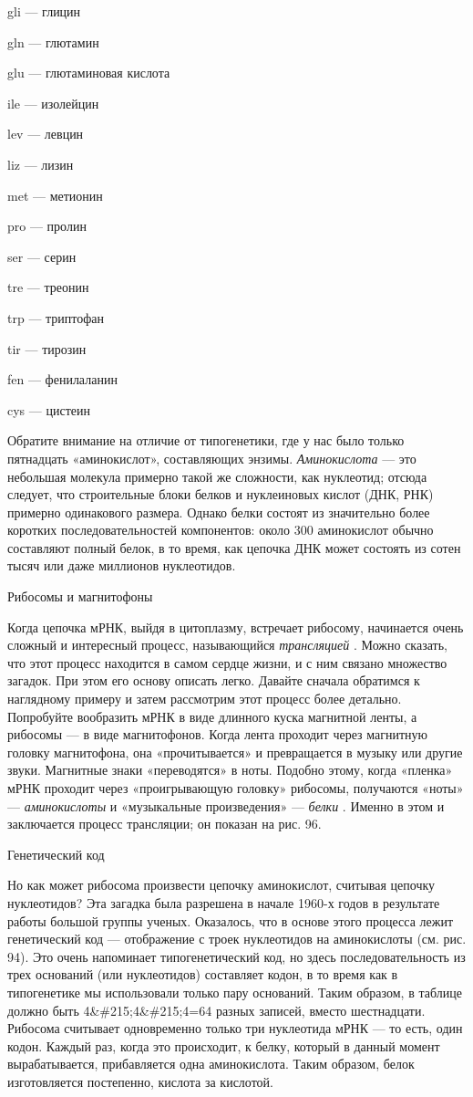 \documentclass[../main.tex]{subfiles}
\begin{document}
gli --- глицин

gln --- глютамин

glu --- глютаминовая кислота

ile --- изолейцин

lev --- левцин

liz --- лизин

met --- метионин

pro --- пролин

ser --- серин

tre --- треонин

trp --- триптофан

tir --- тирозин

fen --- фенилаланин

cys --- цистеин

Обратите внимание на отличие от типогенетики, где у нас было только пятнадцать «аминокислот», составляющих энзимы. \emph{Аминокислота} --- это небольшая молекула примерно такой же сложности, как нуклеотид; отсюда следует, что строительные блоки белков и нуклеиновых кислот (ДНК, РНК) примерно одинакового размера. Однако белки состоят из значительно более коротких последовательностей компонентов: около 300 аминокислот обычно составляют полный белок, в то время, как цепочка ДНК может состоять из сотен тысяч или даже миллионов нуклеотидов.

Рибосомы и магнитофоны

Когда цепочка мРНК, выйдя в цитоплазму, встречает рибосому, начинается очень сложный и интересный процесс, называющийся \emph{трансляцией} . Можно сказать, что этот процесс находится в самом сердце жизни, и с ним связано множество загадок. При этом его основу описать легко. Давайте сначала обратимся к наглядному примеру и затем рассмотрим этот процесс более детально. Попробуйте вообразить мРНК в виде длинного куска магнитной ленты, а рибосомы --- в виде магнитофонов. Когда лента проходит через магнитную головку магнитофона, она «прочитывается» и превращается в музыку или другие звуки. Магнитные знаки «переводятся» в ноты. Подобно этому, когда «пленка» мРНК проходит через «проигрывающую головку» рибосомы, получаются «ноты» --- \emph{аминокислоты} и «музыкальные произведения» --- \emph{белки} . Именно в этом и заключается процесс трансляции; он показан на рис. 96.

Генетический код

Но как может рибосома произвести цепочку аминокислот, считывая цепочку нуклеотидов? Эта загадка была разрешена в начале 1960-х годов в результате работы большой группы ученых. Оказалось, что в основе этого процесса лежит генетический код --- отображение с троек нуклеотидов на аминокислоты (см. рис. 94). Это очень напоминает типогенетический код, но здесь последовательность из трех оснований (или нуклеотидов) составляет кодон, в то время как в типогенетике мы использовали только пару оснований. Таким образом, в таблице должно быть 4\&\#215;4\&\#215;4=64 разных записей, вместо шестнадцати. Рибосома считывает одновременно только три нуклеотида мРНК --- то есть, один кодон. Каждый раз, когда это происходит, к белку, который в данный момент вырабатывается, прибавляется одна аминокислота. Таким образом, белок изготовляется постепенно, кислота за кислотой.
\end{document}

